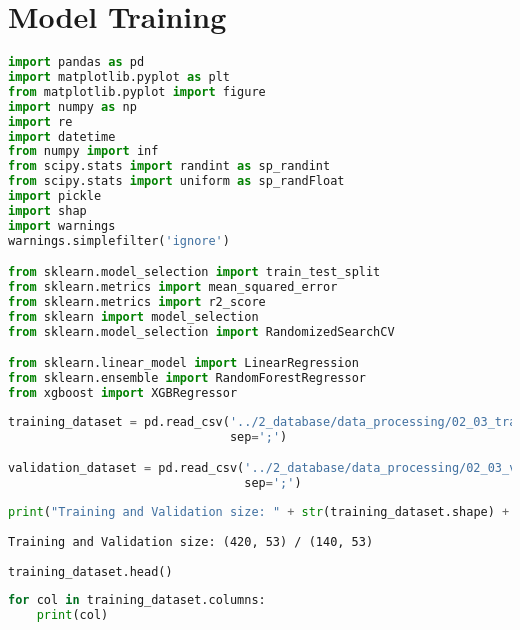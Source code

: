 
\label{ape:model_training}
\hypertarget{model-training}{%
\section{Model Training}\label{model-training}}

\begin{lstlisting}[language=Python]
import pandas as pd
import matplotlib.pyplot as plt
from matplotlib.pyplot import figure
import numpy as np
import re
import datetime
from numpy import inf
from scipy.stats import randint as sp_randint
from scipy.stats import uniform as sp_randFloat
import pickle
import shap
import warnings
warnings.simplefilter('ignore')

from sklearn.model_selection import train_test_split
from sklearn.metrics import mean_squared_error
from sklearn.metrics import r2_score
from sklearn import model_selection
from sklearn.model_selection import RandomizedSearchCV

from sklearn.linear_model import LinearRegression
from sklearn.ensemble import RandomForestRegressor
from xgboost import XGBRegressor
\end{lstlisting}

\begin{lstlisting}[language=Python]
training_dataset = pd.read_csv('../2_database/data_processing/02_03_training_dataset.csv',
                               sep=';')

validation_dataset = pd.read_csv('../2_database/data_processing/02_03_validation_dataset.csv',
                                 sep=';')
\end{lstlisting}

\begin{lstlisting}[language=Python]
print("Training and Validation size: " + str(training_dataset.shape) + " / " + str(validation_dataset.shape))
\end{lstlisting}

\begin{lstlisting}
Training and Validation size: (420, 53) / (140, 53)
\end{lstlisting}

\begin{lstlisting}[language=Python]
training_dataset.head()
\end{lstlisting}

\begin{lstlisting}[language=Python]
for col in training_dataset.columns:
    print(col)
\end{lstlisting}


